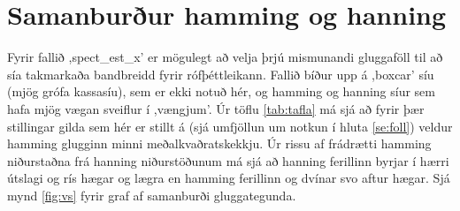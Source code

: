 \documentclass[11pt,a4paper]{article}
\begin{document}
\section{Samanburður hamming og hanning}
Fyrir fallið ,spect\_est\_x' er mögulegt að velja þrjú mismunandi gluggaföll til að sía takmarkaða bandbreidd fyrir
rófþéttleikann. Fallið bíður upp á ,boxcar' síu (mjög grófa kassasíu), sem er ekki notuð hér, og hamming og hanning
síur sem hafa mjög vægan sveiflur í ,vængjum'. Úr töflu \ref{tab:tafla} má sjá að fyrir þær stillingar gilda sem hér
er stillt á (sjá umfjöllun um notkun í hluta \ref{se:foll}) veldur hamming glugginn
minni meðalkvaðratskekkju. Úr rissu af frádrætti hamming niðurstaðna frá hanning niðurstöðunum má sjá að hanning
ferillinn byrjar í hærri útslagi og rís hægar og lægra en hamming ferillinn og dvínar svo aftur hægar. Sjá mynd 
\ref{fig:vs} fyrir graf af samanburði gluggategunda.
\clearpage
\end{document}
